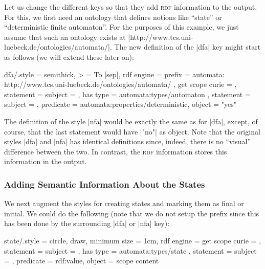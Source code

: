 Let us change the different keys so that they add \textsc{rdf} information to
the output. For this, we first need an ontology that defines notions like
``state'' or ``deterministic finite automaton''. For the purposes of this
example, we just assume that such an ontology exists at
|http://www.tcs.uni-luebeck.de/ontologies/automata/|. The new definition of the
|dfa| key might start as follows (we will extend these later on):
%
\begin{codeexample}
dfa/.style = {
  semithick, > = To [sep], %
  rdf engine = {
    prefix = { automata: http://www.tcs.uni-luebeck.de/ontologies/automata/ },
    get scope curie = \mylibAutomatonCurie,
    statement = {
      subject     = \mylibAutomatonCurie,
      has type    = automata:types/automaton },
    statement = {
      subject     = \mylibAutomatonCurie,
      predicate   = automata:properties/deterministic,
      object      = "yes" } } }
\end{codeexample}

The definition of the style |nfa| would be exactly the same as for |dfa|,
except, of course, that the last statement would have |"no"| as object. Note
that the original styles |dfa| and |nfa| has identical definitions since,
indeed, there is no ``visual'' difference between the two. In contrast, the
\textsc{rdf} information stores this information in the output.


\subsubsection{Adding Semantic Information About the States}

We next augment the styles for creating states and marking them as final or
initial. We could do the following (note that we do not setup the prefix since
this has been done by the surrounding |dfa| or |nfa| key):
%
\begin{codeexample}
state/.style = {
  circle, draw, minimum size = 1cm, %
  rdf engine = {
    get scope curie = \mylibStateCurie,
    statement = {
      subject     = \mylibStateCurie,
      has type    = automata:types/state },
    statement = {
      subject     = \mylibStateCurie,
      predicate   = rdf:value,
      object      = scope content } } }
\end{codeexample}

